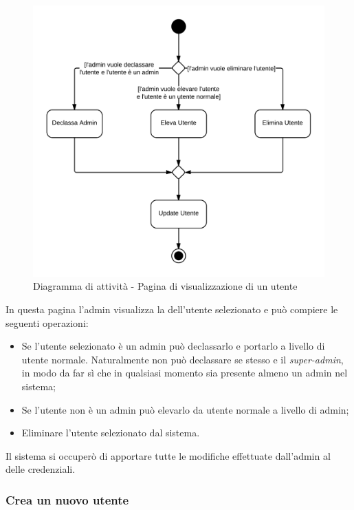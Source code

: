 \begin{figure}[H]
\centering
\includegraphics[scale=0.2]{uml/MaaP - Apri show-page utente.png}
\caption{Diagramma di attività - Pagina di visualizzazione di un utente}
\end{figure}

In questa pagina l'admin visualizza la  dell'utente selezionato e può compiere le seguenti operazioni:

\begin{itemize}

	\item Se l'utente selezionato è un admin può declassarlo e portarlo a livello di utente normale. Naturalmente non può declassare se stesso e il \textit{super-admin}, in modo da far sì che in qualsiasi momento sia presente almeno un admin nel sistema;
	\item Se l'utente non è un admin può elevarlo da utente normale a livello di admin;
	\item Eliminare l'utente selezionato dal sistema.

\end{itemize}

Il sistema  si occuperò di apportare tutte le modifiche effettuate dall'admin al  delle credenziali.

\subsubsection{Crea un nuovo utente}

